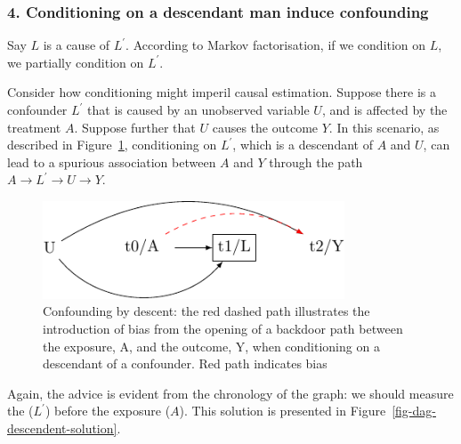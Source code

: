 \documentclass[
  singlecolumn]{article}
\begin{document}
\hypertarget{conditioning-on-a-descendant-man-induce-confounding}{%
\subsubsection{4. Conditioning on a descendant man induce
confounding}\label{conditioning-on-a-descendant-man-induce-confounding}}

Say \(L\) is a cause of \(L^\prime\). According to Markov factorisation,
if we condition on \(L\), we partially condition on \(L^\prime\).

Consider how conditioning might imperil causal estimation. Suppose there
is a confounder \(L^\prime\) that is caused by an unobserved variable
\(U\), and is affected by the treatment \(A\). Suppose further that
\(U\) causes the outcome \(Y\). In this scenario, as described in
Figure~\ref{fig-dag-descendent}, conditioning on \(L^\prime\), which is
a descendant of \(A\) and \(U\), can lead to a spurious association
between \(A\) and \(Y\) through the path \(A \to L^\prime \to U \to Y\).

\begin{figure}

{\centering \includegraphics[width=0.8\textwidth,height=\textheight]{causal-dags_files/figure-pdf/fig-dag-descendent-1.pdf}

}

\caption{\label{fig-dag-descendent}Confounding by descent: the red
dashed path illustrates the introduction of bias from the opening of a
backdoor path between the exposure, A, and the outcome, Y, when
conditioning on a descendant of a confounder. Red path indicates bias}

\end{figure}

Again, the advice is evident from the chronology of the graph: we should
measure the (\(L^\prime\)) before the exposure (\(A\)). This solution is
presented in Figure~\ref{fig-dag-descendent-solution}.
\end{document}
